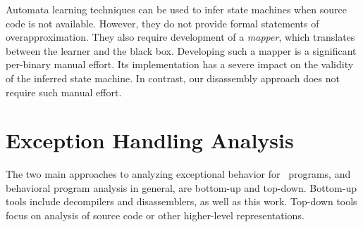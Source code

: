 Automata learning techniques can be used to infer state machines when source code is not available.
However, they do not provide formal statements of overapproximation.
They also require development of a \emph{mapper}, which translates between the learner and the black box.
Developing such a mapper is a significant per-binary manual effort.
Its implementation has a severe impact on the validity of the inferred state machine.
In contrast, our disassembly approach does not require such manual effort.

\section{Exception Handling Analysis}\label{related-exceptions}
The two main approaches to analyzing exceptional behavior for \Cpp\ programs, and behavioral program analysis in general, are bottom-up and top-down.
Bottom-up tools include decompilers and disassemblers, as well as this work.
Top-down tools focus on analysis of source code or other higher-level representations.

